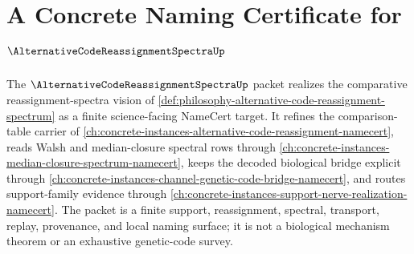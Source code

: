 \chapter{A Concrete Naming Certificate for $\AlternativeCodeReassignmentSpectraUp$}
\label{ch:concrete-instances-alternative-code-reassignment-spectra-namecert}

The $\AlternativeCodeReassignmentSpectraUp$ packet realizes the comparative reassignment-spectra vision of \autoref{def:philosophy-alternative-code-reassignment-spectrum} as a finite science-facing NameCert target. It refines the comparison-table carrier of \autoref{ch:concrete-instances-alternative-code-reassignment-namecert}, reads Walsh and median-closure spectral rows through \autoref{ch:concrete-instances-median-closure-spectrum-namecert}, keeps the decoded biological bridge explicit through \autoref{ch:concrete-instances-channel-genetic-code-bridge-namecert}, and routes support-family evidence through \autoref{ch:concrete-instances-support-nerve-realization-namecert}. The packet is a finite support, reassignment, spectral, transport, replay, provenance, and local naming surface; it is not a biological mechanism theorem or an exhaustive genetic-code survey.

